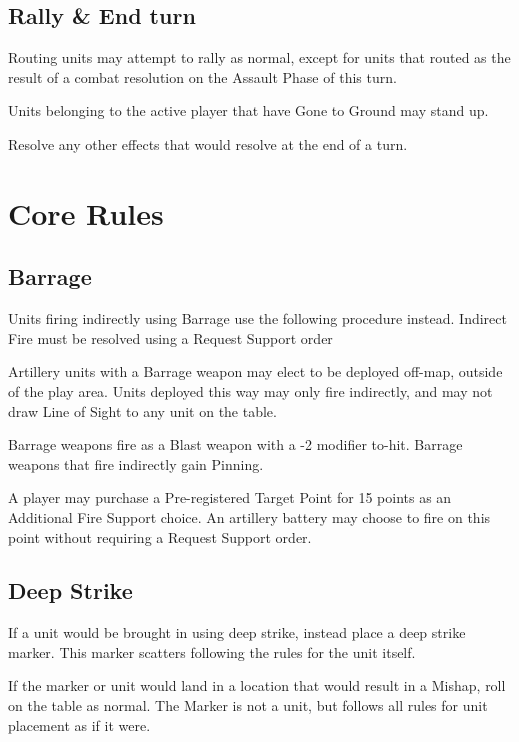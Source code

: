 \documentclass[letterpaper,twocolumn,oneside,titlepage]{book}
\begin{document}
\section{\texorpdfstring{\textbf{Rally \& End
turn}}{Rally \& End turn}}\label{rally-end-turn}

Routing units may attempt to rally as normal, except for units that
routed as the result of a combat resolution on the Assault Phase of this
turn.

Units belonging to the active player that have Gone to Ground may stand
up.

Resolve any other effects that would resolve at the end of a turn.

\chapter{\texorpdfstring{\textbf{Core
Rules}}{Core Rules}}\label{core-rules}

\section{\texorpdfstring{\textbf{Barrage}}{Barrage}}\label{barrage}

Units firing indirectly using Barrage use the following procedure
instead. Indirect Fire must be resolved using a Request Support order

Artillery units with a Barrage weapon may elect to be deployed off-map,
outside of the play area.
Units deployed this way may only fire indirectly, and may not draw Line
of Sight to any unit on the table.

Barrage weapons fire as a Blast weapon with a -2 modifier to-hit.
Barrage weapons that fire indirectly gain Pinning.

A player may purchase a Pre-registered Target Point for 15 points as an
Additional Fire Support choice. An artillery battery may choose to fire
on this point without requiring a Request Support order. 


\section{\texorpdfstring{\textbf{Deep
Strike}}{Deep Strike}}\label{deep-strike}

If a unit would be brought in using deep strike, instead place a deep
strike marker. This marker scatters following the rules for the unit
itself.

If the marker or unit would land in a location that would result in a
Mishap, roll on the table as normal. The Marker is not a unit, but
follows all rules for unit placement as if it were.
\end{document}
